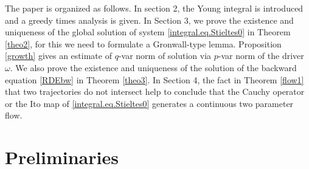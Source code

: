 \documentclass[10pt]{article}
\numberwithin{equation}{section} %
\begin{document}
The paper is organized as follows. In section 2, the Young integral is introduced and a greedy times analysis is given. In Section 3, we prove the existence and uniqueness of the global solution of system \eqref{integral.eq.Stieltes0} in Theorem \ref{theo2}, for this we need to formulate a Gronwall-type lemma. Proposition \ref{growth}  gives an estimate of $q$-var norm of solution via $p$-var norm of the driver $\omega$. We also prove the existence and uniqueness of the solution of the backward equation \eqref{RDEbw} in Theorem \ref{theo3}. In Section 4, the fact in Theorem \ref{flow1} that two trajectories do not intersect help to conclude that the Cauchy operator or the Ito map of \eqref{integral.eq.Stieltes0} generates a continuous two parameter flow.%

\section{Preliminaries}
\end{document}
